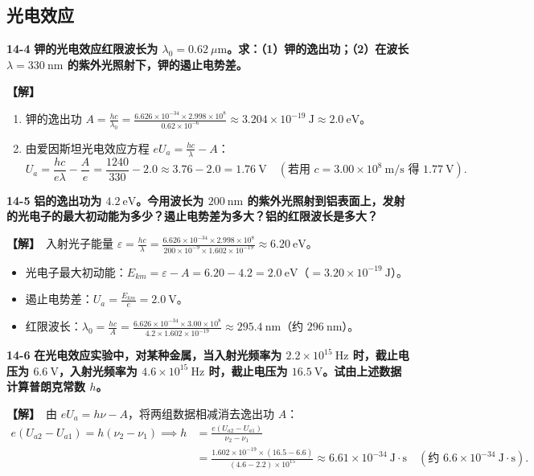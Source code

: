 \documentclass[zihao=5,a4paper,UTF8]{ctexart}
\newenvironment{prob}[2]{%
    \par\vspace{6pt}\noindent\textbf{\color{navy}#1} \textbf{#2}\par\nopagebreak\vspace{2pt}%
}{%
    \par\vspace{4pt}%
}
\newcommand{\sol}{\noindent\textbf{\color{tealaccent}【解】}\ }
\begin{document}
\subsection{光电效应}

\begin{prob}{14-4}{钾的光电效应红限波长为 $\lambda_0=0.62\ \mu\mathrm{m}$。求：（1）钾的逸出功；（2）在波长 $\lambda=330\ \mathrm{nm}$ 的紫外光照射下，钾的遏止电势差。}
\sol
\begin{enumerate}[leftmargin=2em, itemsep=2pt]
    \item 钾的逸出功 $A = \frac{hc}{\lambda_0} = \frac{6.626\times 10^{-34}\times 2.998\times 10^8}{0.62\times 10^{-6}} \approx 3.204\times 10^{-19}\ \mathrm{J} \approx 2.0\ \mathrm{eV}$。
    \item 由爱因斯坦光电效应方程 $eU_a = \frac{hc}{\lambda} - A$：
    \[
        U_a = \frac{hc}{e\lambda} - \frac{A}{e} = \frac{1240}{330} - 2.0 \approx 3.76 - 2.0 = 1.76\ \mathrm{V}\quad (\text{若用 } c=3.00\times 10^8\ \mathrm{m/s}\text{ 得 } 1.77\ \mathrm{V}).
    \]
\end{enumerate}
\end{prob}

\begin{prob}{14-5}{铝的逸出功为 $4.2\ \mathrm{eV}$。今用波长为 $200\ \mathrm{nm}$ 的紫外光照射到铝表面上，发射的光电子的最大初动能为多少？遏止电势差为多大？铝的红限波长是多大？}
\sol 入射光子能量 $\varepsilon = \frac{hc}{\lambda} = \frac{6.626\times 10^{-34}\times 2.998\times 10^8}{200\times 10^{-9}\times 1.602\times 10^{-19}} \approx 6.20\ \mathrm{eV}$。
\begin{itemize}[leftmargin=1.5em, itemsep=2pt]
    \item 光电子最大初动能：$E_{km} = \varepsilon - A = 6.20 - 4.2 = 2.0\ \mathrm{eV}$（$= 3.20\times 10^{-19}\ \mathrm{J}$）。
    \item 遏止电势差：$U_a = \frac{E_{km}}{e} = 2.0\ \mathrm{V}$。
    \item 红限波长：$\lambda_0 = \frac{hc}{A} = \frac{6.626\times 10^{-34}\times 3.00\times 10^8}{4.2\times 1.602\times 10^{-19}} \approx 295.4\ \mathrm{nm}$（约 $296\ \mathrm{nm}$）。
\end{itemize}
\end{prob}

\begin{prob}{14-6}{在光电效应实验中，对某种金属，当入射光频率为 $2.2\times 10^{15}\ \mathrm{Hz}$ 时，截止电压为 $6.6\ \mathrm{V}$，入射光频率为 $4.6\times 10^{15}\ \mathrm{Hz}$ 时，截止电压为 $16.5\ \mathrm{V}$。试由上述数据计算普朗克常数 $h$。}
\sol 由 $eU_a = h\nu - A$，将两组数据相减消去逸出功 $A$：
\begin{align*}
    e(U_{a2} - U_{a1}) = h(\nu_2 - \nu_1) \implies h &= \frac{e(U_{a2} - U_{a1})}{\nu_2 - \nu_1} \\
    &= \frac{1.602\times 10^{-19}\times (16.5 - 6.6)}{(4.6 - 2.2)\times 10^{15}} \approx 6.61\times 10^{-34}\ \mathrm{J\cdot s}\quad (\text{约 } 6.6\times 10^{-34}\ \mathrm{J\cdot s}).
\end{align*}
\end{prob}
\end{document}
